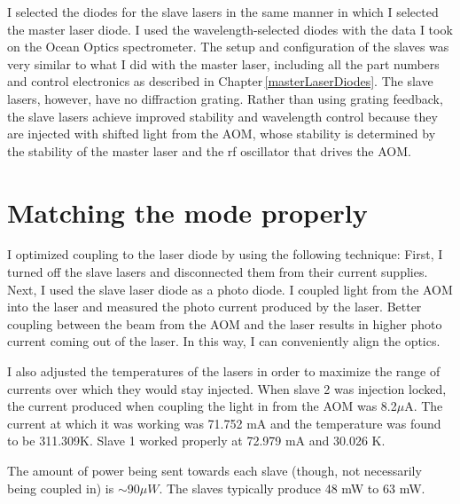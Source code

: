 I selected the diodes for the slave lasers in the same manner in which I selected the master laser diode. I used the wavelength-selected diodes with the data I took on the Ocean Optics spectrometer. The setup and configuration of the slaves was very similar to what I did with the master laser, including all the part numbers and control electronics as described in Chapter\,\ref{masterLaserDiodes}. The slave lasers, however, have no diffraction grating. Rather than using grating feedback, the slave lasers achieve improved stability and wavelength control because they are injected with shifted light from the AOM, whose stability is determined by the stability of the master laser and the rf oscillator that drives the AOM. 




\section{Matching the mode properly}
I optimized coupling to the laser diode by using the following technique: First, I turned off the slave lasers and disconnected them from their current supplies. Next, I used the slave laser diode as a photo diode. I coupled light from the AOM into the laser and measured the photo current produced by the laser. Better coupling between the beam from the AOM and the laser results in higher photo current coming out of the laser. In this way, I can conveniently align the optics. 

I also adjusted the temperatures of the lasers in order to maximize the range of currents over which they would stay injected. 
When slave 2 was injection locked, the current produced when coupling the light in from the AOM was 8.2$\mu$A. The current at which it was working was 71.752 mA %
and the temperature was found to be 311.309K. %
Slave 1 worked properly at 72.979 mA and 30.026 K.

The amount of power being sent towards each slave (though, not necessarily being coupled in) is $\sim$90$\mu W$. The slaves typically produce 48 mW to 63 mW.
